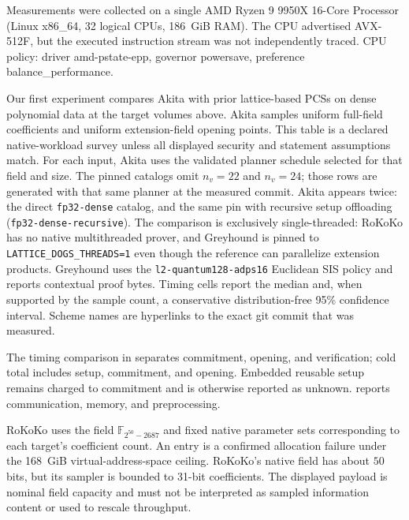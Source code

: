 Measurements were collected on a single AMD Ryzen 9 9950X 16-Core Processor (Linux x86\_64, 32 logical CPUs, 186~GiB RAM). The CPU advertised AVX-512F, but the executed instruction stream was not independently traced. CPU policy: driver amd-pstate-epp, governor powersave, preference balance\_performance.

Our first experiment compares Akita with prior lattice-based PCSs on dense
polynomial data at the target volumes above. Akita samples uniform full-field
coefficients and uniform extension-field opening points. This table is a declared
native-workload survey unless all displayed security and statement assumptions match.
For each input, Akita
uses the validated planner schedule selected for that field and size.
The pinned catalogs omit $n_v=22$ and $n_v=24$; those rows are generated
with that same planner at the measured commit.
Akita appears twice: the direct \texttt{fp32-dense} catalog, and the same pin
with recursive setup offloading (\texttt{fp32-dense-recursive}).
The comparison is exclusively single-threaded: RoKoKo has no native multithreaded
prover, and Greyhound is pinned to \texttt{LATTICE\_DOGS\_THREADS=1} even though the
reference can parallelize extension products. Greyhound uses the
\texttt{l2-quantum128-adps16} Euclidean SIS policy and reports contextual proof bytes.
Timing cells report the median and, when supported by the sample count, a
conservative distribution-free 95\% confidence interval. Scheme names are hyperlinks to the exact git commit that was measured.

The timing comparison in  separates commitment,
opening, and verification; cold total includes setup, commitment, and opening.
Embedded reusable setup remains charged to commitment and is otherwise reported as unknown.
 reports communication, memory, and preprocessing.

RoKoKo uses the field $\mathbb F_{2^{50}-2687}$ and fixed native parameter
sets corresponding to each target's coefficient count.  An
\evaloom{} entry is a confirmed allocation failure under the 168~GiB virtual-address-space ceiling.
RoKoKo's native field has about $50$ bits, but its sampler is bounded to
31-bit coefficients. The displayed payload is nominal field capacity and must not
be interpreted as sampled information content or used to rescale throughput.

